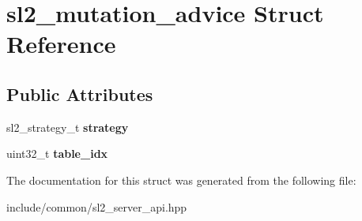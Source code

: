 \hypertarget{structsl2__mutation__advice}{}\section{sl2\+\_\+mutation\+\_\+advice Struct Reference}
\label{structsl2__mutation__advice}
\subsection*{Public Attributes}
\begin{DoxyCompactItemize}
\item 
\mbox{\label{structsl2__mutation__advice_ab78b7a489db66ab811e19b4998c3eb7a}} 
sl2\+\_\+strategy\+\_\+t {\bfseries strategy}
\item 
\mbox{\label{structsl2__mutation__advice_abe57e16f82b0f09e051fcfbd55595dfb}} 
uint32\+\_\+t {\bfseries table\+\_\+idx}
\end{DoxyCompactItemize}


The documentation for this struct was generated from the following file\+:\begin{DoxyCompactItemize}
\item 
include/common/sl2\+\_\+server\+\_\+api.\+hpp\end{DoxyCompactItemize}
